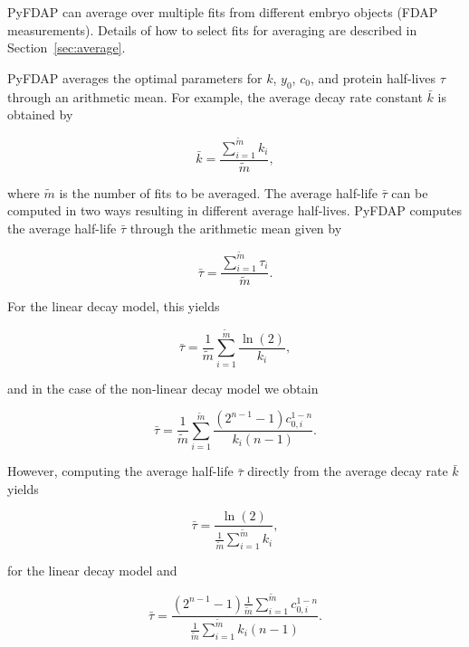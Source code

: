 \documentclass[a4paper,11pt]{article}
\begin{document}
PyFDAP can average over multiple fits from different embryo objects (FDAP measurements). Details of how to select fits for averaging are described in Section~\ref{sec:average}.

PyFDAP averages the optimal parameters for $k$, $y_0$, $c_0$, and protein half-lives $\tau$ through an arithmetic mean. For example, the average decay rate constant $\bar{k}$ is obtained by

\begin{equation*}
 \bar{k}=\frac{\sum\limits_{i=1}^{\tilde{m}} k_i} {\tilde{m}},
\end{equation*}

\noindent where $\tilde{m}$ is the number of fits to be averaged. The average half-life $\bar{\tau}$ can be computed in two ways resulting in different average
half-lives. PyFDAP computes the average half-life $\bar{\tau}$ through the arithmetic mean given by

\begin{equation*}
 \bar{\tau}=\frac{\sum\limits_{i=1}^{\tilde{m}} \tau_i} {\tilde{m}}.
\end{equation*}

\noindent For the linear decay model, this yields

\begin{equation}
\label{equ:lin_1}
 \bar{\tau}=\frac{1}{\tilde{m}}\sum\limits_{i=1}^{\tilde{m}} \frac{\ln(2)}{k_i},
\end{equation}

\noindent and in the case of the non-linear decay model we obtain

\begin{equation}
\label{equ:nonlin_1}
 \bar{\tau}=\frac{1}{\tilde{m}}\sum\limits_{i=1}^{\tilde{m}} \frac{(2^{n-1}-1) c_{0,i}^{1-n}}{k_{i}(n-1)}.
\end{equation}

\noindent However, computing the average half-life $\bar{\tau}$ directly from the average decay rate $\bar{k}$ yields 

\begin{equation}
\label{equ:lin_2}
 \bar{\tau}=\frac{\ln(2)}{\frac{1}{\tilde{m}}\sum\limits_{i=1}^{\tilde{m}} k_i},
\end{equation}

\noindent for the linear decay model and

\begin{equation}
\label{equ:nonlin_2}
 \bar{\tau}= \frac{(2^{n-1}-1) \frac{1}{\tilde{m}}\sum\limits_{i=1}^{\tilde{m}} c_{0,i}^{1-n}}{\frac{1}{\tilde{m}}\sum\limits_{i=1}^{\tilde{m}}k_{i}(n-1)}.
\end{equation}
\end{document}
